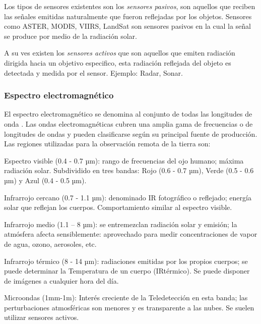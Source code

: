 Los tipos de sensores existentes son los  \textit{sensores pasivos}, son aquellos que reciben las señales emitidas naturalmente que fueron reflejadas por los objetos. Sensores como ASTER, MODIS, VIIRS, LandSat son sensores pasivos en la cual la señal se produce por medio de la radiación solar.

A su ves existen los \textit{sensores activos} que son aquellos que emiten radiación dirigida hacia un objetivo especifico, esta radiación reflejada del objeto es detectada y medida por el sensor. Ejemplo: Radar, Sonar.

\subsubsection{Espectro electromagnético}

El espectro electromagnético se denomina al conjunto de todas las longitudes de onda \citep{chuvieco}. Las ondas electromagnéticas cubren una amplia gama de frecuencias o de longitudes de ondas y pueden clasificarse según su principal fuente de producción. 
Las regiones utilizadas para la observación remota de la tierra son:

\par Espectro visible (0.4 - 0.7 µm): rango de frecuencias del ojo humano; máxima radiación solar. Subdividido en tres bandas: Rojo (0.6 - 0.7 µm), Verde (0.5 - 0.6 µm) y Azul (0.4 - 0.5 µm).

\par Infrarrojo cercano (0.7 - 1.1 µm): denominado IR fotográfico o reflejado; energía solar que reflejan los cuerpos. Comportamiento similar al espectro visible.

\par Infrarrojo medio (1.1 – 8 µm): se entremezclan radiación solar y emisión; la atmósfera afecta sensiblemente: aprovechado para medir concentraciones de vapor de agua, ozono, aerosoles, etc.

\par Infrarrojo térmico (8 - 14 µm): radiaciones emitidas por los propios cuerpos; se puede determinar la Temperatura de un cuerpo (IRtérmico). Se puede disponer de imágenes a cualquier hora del día.

\par Microondas (1mm-1m): Interés creciente de la Teledetección en esta banda; las perturbaciones atmosféricas son menores y es transparente a las nubes. Se suelen utilizar sensores activos. 


